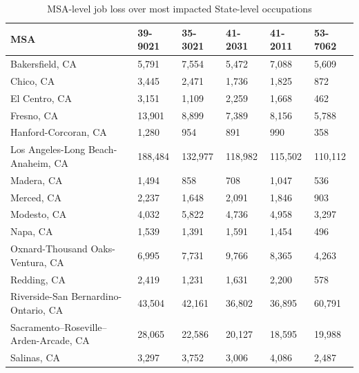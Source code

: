 \documentclass[10pt]{article}
\begin{document}
\begin{table}[H]
\begin{threeparttable}
\caption{MSA-level job loss over most impacted State-level occupations}
\begin{tabular}{llllll}
MSA                                           & 39-9021\tnote{1} & 35-3021\tnote{2} & 41-2031\tnote{3} & 41-2011\tnote{4} & 53-7062\tnote{5} \\
\hline
Bakersfield, CA                               & 5,791    & 7,554    & 5,472    & 7,088    & 5,609    \\
Chico, CA                                     & 3,445    & 2,471    & 1,736    & 1,825    & 872      \\
El Centro, CA                                 & 3,151    & 1,109    & 2,259    & 1,668    & 462      \\
Fresno, CA                                    & 13,901   & 8,899    & 7,389    & 8,156    & 5,788    \\
Hanford-Corcoran, CA                          & 1,280    & 954      & 891      & 990      & 358      \\
Los Angeles-Long Beach-Anaheim, CA            & 188,484  & 132,977  & 118,982  & 115,502  & 110,112  \\
Madera, CA                                    & 1,494    & 858      & 708      & 1,047    & 536      \\
Merced, CA                                    & 2,237    & 1,648    & 2,091    & 1,846    & 903      \\
Modesto, CA                                   & 4,032    & 5,822    & 4,736    & 4,958    & 3,297    \\
Napa, CA                                      & 1,539    & 1,391    & 1,591    & 1,454    & 496      \\
Oxnard-Thousand Oaks-Ventura, CA              & 6,995    & 7,731    & 9,766    & 8,365    & 4,263    \\
Redding, CA                                   & 2,419    & 1,231    & 1,631    & 2,200    & 578      \\
Riverside-San Bernardino-Ontario, CA          & 43,504   & 42,161   & 36,802   & 36,895   & 60,791   \\
Sacramento--Roseville--Arden-Arcade, CA       & 28,065   & 22,586   & 20,127   & 18,595   & 19,988   \\
Salinas, CA                                   & 3,297    & 3,752    & 3,006    & 4,086    & 2,487    \\

\end{tabular}
\end{threeparttable}
\end{table}
\end{document}
